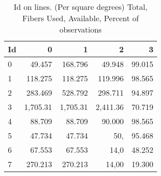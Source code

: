 \documentclass{article}
\begin{document}
\begin{table}[h]\begin{center}
\caption{Id on lines. (Per square degrees) Total, Fibers Used, Available, Percent of observations}
\begin{tabular}{l|rrrr} 
	Id &          0  &           1  &           2  &           3 \\ \hline
   0  &      49.457  &     168.796  &      49.948  &      99.015   \\
   1  &     118.275  &     118.275  &     119.996  &      98.565   \\
   2  &     283.469  &     528.792  &     298.711  &      94.897   \\
   3  &    1,705.31  &    1,705.31  &    2,411.36  &      70.719   \\
   4  &      88.709  &      88.709  &      90.000  &      98.565   \\
   5  &      47.734  &      47.734  &         50,  &      95.468   \\
   6  &      67.553  &      67.553  &        14,0  &      48.252   \\
   7  &     270.213  &     270.213  &       14,00  &      19.300   \\
\end{tabular}\end{center}
 \end{table}
\end{document}
